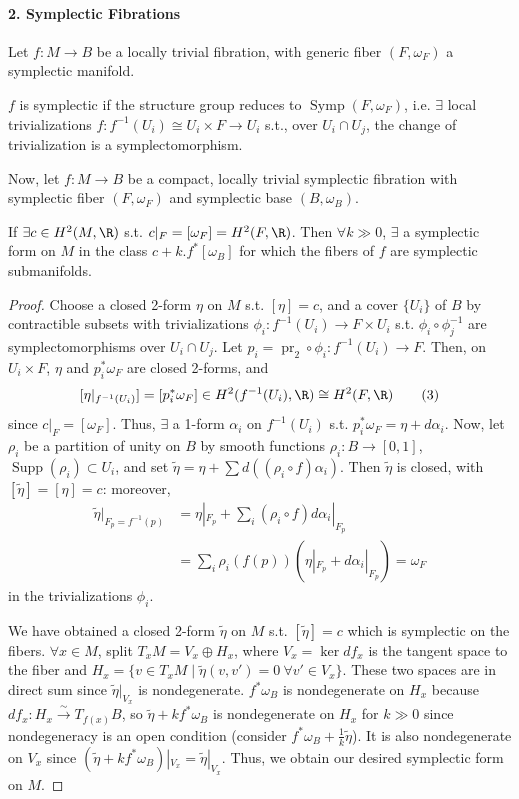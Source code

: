 \paragraph{2. Symplectic Fibrations}
Let $f:M\to B$ be a locally trivial fibration, with generic fiber $(F,\omega_F)$ a symplectic manifold.
\begin{definition}[1]
$f$ is symplectic if the structure group reduces to $\operatorname{Symp}(F,\omega_F)$, i.e. $\exists$ local trivializations $f:f^{-1}(U_i)\cong U_i\times F\to U_i$ s.t., over $U_i\cap U_j$, the change of trivialization is a symplectomorphism.
\end{definition}
Now, let $f:M\to B$ be a compact, locally trivial symplectic fibration with symplectic fiber $(F,\omega_F)$ and symplectic base $(B,\omega_B)$.
\begin{theorem}[1 (Thurston)]
If $\exists c\in H^2(M,\R)$ s.t. $c|_F=[\omega_F]=H^2(F,\R)$. Then $\forall k\gg0$, $\exists$ a symplectic form on $M$ in the class $c+k.f^*[\omega_B]$ for which the fibers of $f$ are symplectic submanifolds.
\end{theorem}
\begin{proof}
Choose a closed 2-form $\eta$ on $M$ s.t. $[\eta]=c$, and a cover $\{U_i\}$ of $B$ by contractible subsets with trivializations $\phi_i:f^{-1}(U_i)\to F\times U_i$ s.t. $\phi_i\circ\phi_j^{-1}$ are symplectomorphisms over $U_i\cap U_j$. Let $p_i=\operatorname{pr}_2\circ\phi_i:f^{-1}(U_i)\to F$. Then, on $U_i\times F$, $\eta$ and $p_i^*\omega_F$ are closed 2-forms, and
\[
[\eta|_{f^{-1}(U_i)}]=[p_i^*\omega_F]\in H^2(f^{-1}(U_i),\R)\cong H^2(F,\R) \tag{3}
\]
since $c|_F=[\omega_F]$. Thus, $\exists$ a 1-form $\alpha_i$ on $f^{-1}(U_i)$ s.t. $p_i^*\omega_F=\eta+d\alpha_i$. Now, let $\rho_i$ be a partition of unity on $B$ by smooth functions $\rho_i:B\to[0,1]$, $\operatorname{Supp}(\rho_i)\subset U_i$, and set $\widetilde\eta=\eta+\sum d((\rho_i\circ f)\alpha_i)$. Then $\widetilde\eta$ is closed, with $[\widetilde\eta]=[\eta]=c$: moreover,
\begin{align*}
\widetilde\eta|_{F_p=f^{-1}(p)}
&=\eta|_{F_p}+\sum_i(\rho_i\circ f)d\alpha_i|_{F_p}\\
&=\sum_i\rho_i(f(p))(\eta|_{F_p}+d\alpha_i|_{F_p})=\omega_F \tag{4}
\end{align*}
in the trivializations $\phi_i$.

We have obtained a closed 2-form $\widetilde\eta$ on $M$ s.t. $[\widetilde\eta]=c$ which is symplectic on the fibers. $\forall x\in M$, split $T_xM=V_x\oplus H_x$, where $V_x=\ker df_x$ is the tangent space to the fiber and $H_x=\{v\in T_xM\mid\widetilde\eta(v,v')=0\ \forall v'\in V_x\}$. These two spaces are in direct sum since $\widetilde\eta|_{V_x}$ is nondegenerate. $f^*\omega_B$ is nondegenerate on $H_x$ because $df_x:H_x\xrightarrow{\sim}T_{f(x)}B$, so $\widetilde\eta+kf^*\omega_B$ is nondegenerate on $H_x$ for $k\gg0$ since nondegeneracy is an open condition (consider $f^*\omega_B+\frac1k\widetilde\eta$). It is also nondegenerate on $V_x$ since $(\widetilde\eta+kf^*\omega_B)|_{V_x}=\widetilde\eta|_{V_x}$. Thus, we obtain our desired symplectic form on $M$.
\end{proof}